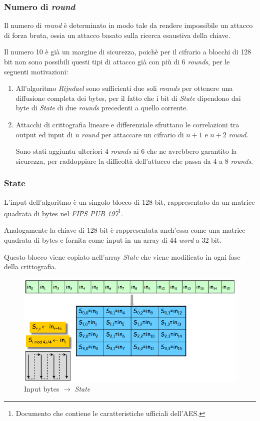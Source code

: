 \documentclass[a4paper,11pt]{article}
\begin{document}
\subsubsection{Numero di \textit{round}}
Il numero di \textit{round} è determinato in modo tale da rendere impossibile un attacco di forza bruta, ossia un attacco basato sulla ricerca esaustiva della chiave.

Il numero 10 è già un margine di sicurezza, poichè per il cifrario a blocchi di 128 bit non sono possibili questi tipi di attacco già con più di 6 \textit{rounds}, per le seguenti motivazioni:
\begin{enumerate}
    \item All'algoritmo \textit{Rijndael} sono sufficienti due soli \textit{rounds} per ottenere una diffusione completa dei bytes, per il fatto che i bit di \textit{State} dipendono dai byte di \textit{State} di due \textit{rounds} precedenti a quello corrente.
    \item Attacchi di crittografia lineare e differenziale sfruttano le correlazioni tra output ed input di \textit{n round} per attaccare un cifrario di $n+1$ e $n+2$ \textit{round}.
    
    Sono stati aggiuntu ulteriori 4 \textit{rounds} ai 6 che ne avrebbero garantito la sicurezza, per raddoppiare la difficoltà dell'attacco che passa da 4 a 8 \textit{rounds}.
\end{enumerate}
\subsubsection{State}
L'input dell'algoritmo è un singolo blocco di 128 bit, rappresentato da un matrice quadrata di bytes nel \href{https://nvlpubs.nist.gov/nistpubs/FIPS/NIST.FIPS.197.pdf}{\textit{FIPS PUB 197}}\footnote{Documento che contiene le caratteristiche ufficiali dell'AES.}. 

Analogamente la chiave di 128 bit è rappresentata anch'essa come una matrice quadrata di bytes e fornita come input in un array di 44 \textit{word} a 32 bit.

Questo blocco viene copiato nell'array \textit{State} che viene modificato in ogni fase della crittografia.

\begin{figure}[H]
    \centering
    \includegraphics[scale=0.5]{stateIN}
    \caption{Input bytes $\rightarrow$ \textit{State}}
\end{figure}
\end{document}
